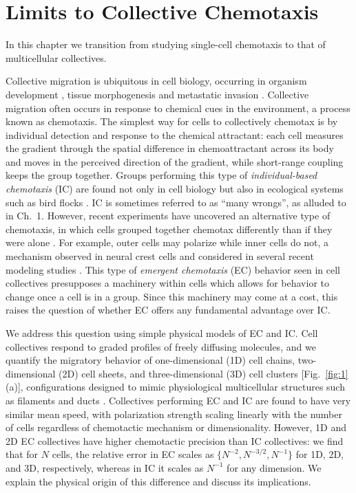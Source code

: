 
\chapter{Limits to Collective Chemotaxis}

In this chapter we transition from studying single-cell chemotaxis to that of multicellular collectives.

Collective migration is ubiquitous in cell biology, occurring in organism development \cite{theveneau2010collective,cai2016modeling,bianco2007two,montell2008morphogenetic},
tissue morphogenesis \cite{ellison2016cell} and metastatic invasion
\cite{kim2013cooperative,friedl2009collective,friedl2012classifying,deisboeck2009collective}.
Collective migration often occurs in response to chemical cues in the environment, a process known as chemotaxis. The simplest way for cells to collectively chemotax is by individual detection and response to the chemical attractant: each cell measures the gradient through the spatial difference in chemoattractant across its body and moves in the perceived direction of the gradient, while short-range coupling keeps the group together. Groups performing this type of \textit{individual-based chemotaxis} (IC) are found not only in cell biology \cite{kulesa1998neural} but also in ecological systems such as bird flocks \cite{simons2004many}.
IC is sometimes referred to as ``many wrongs'', as alluded to in Ch.\ 1.
However, recent experiments have uncovered an alternative type of chemotaxis, in which cells grouped together chemotax differently than if they were alone \cite{haeger2015collective,malet2015collective,leber2009molecular,gaggioli2007fibroblast}.
For example, outer cells may polarize while inner cells do not, a mechanism observed in neural crest cells \cite{theveneau2010collective} and considered in several recent modeling studies
\cite{malet2015collective,camley2016emergent,varennes2016collective}. This type of \textit{emergent chemotaxis} (EC) behavior seen in cell collectives presupposes a machinery within cells which allows for behavior to change once a cell is in a group. Since this machinery may come at a cost, this raises the question of whether EC offers any fundamental advantage over IC.

We address this question using simple physical models of EC and IC. Cell collectives respond to graded profiles of freely diffusing molecules, and we quantify the migratory behavior of one-dimensional (1D) cell chains, two-dimensional (2D) cell sheets, and three-dimensional (3D) cell clusters [Fig.\ \ref{fig:1}(a)], configurations designed to mimic physiological multicellular structures such as filaments and ducts \cite{cheung2013collective,friedl2009collective,bardeesy2002pancreatic}. Collectives performing EC and IC are found to have very similar mean speed, with polarization strength scaling linearly with the number of cells regardless of chemotactic mechanism or dimensionality. However, 1D and 2D EC collectives have higher chemotactic precision than IC collectives: we find that for $N$ cells, the relative error in EC scales as
$\{N^{-2}, N^{-3/2}, N^{-1}\}$ for 1D, 2D, and 3D, respectively, whereas in IC it scales as $N^{-1}$ for any dimension. We explain the physical origin of this difference and discuss its implications.

